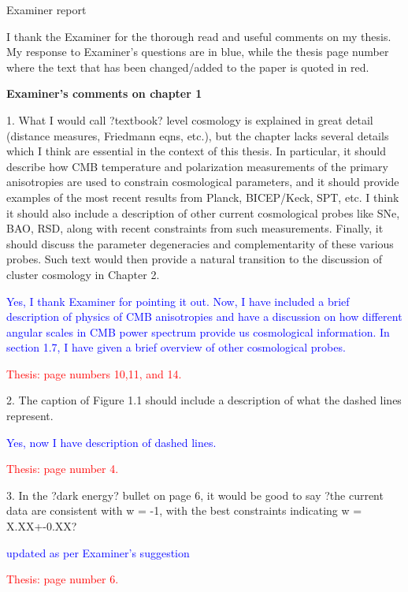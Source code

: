 \documentclass[11pt,a4paper]{article}
\begin{document}
\begin{center}
Examiner report
\end{center}
I thank the Examiner for the thorough read and useful comments on my thesis. My response to Examiner's questions are
in blue, while the thesis page number where the text that has been changed/added to the paper is quoted in red.

\begin{center}
\textbf{Examiner's comments on chapter 1}
\end{center}


1. What I would call ?textbook? level cosmology is explained in great detail (distance
measures, Friedmann eqns, etc.), but the chapter lacks several details which I
think are essential in the context of this thesis. In particular, it should describe
how CMB temperature and polarization measurements of the primary
anisotropies are used to constrain cosmological parameters, and it should
provide examples of the most recent results from Planck, BICEP/Keck, SPT, etc.
I think it should also include a description of other current cosmological probes
like SNe, BAO, RSD, along with recent constraints from such measurements.
Finally, it should discuss the parameter degeneracies and complementarity of
these various probes. Such text would then provide a natural transition to the
discussion of cluster cosmology in Chapter 2.

\textcolor{blue}{Yes, I thank Examiner for pointing it out. Now, I have included a brief description of physics of CMB anisotropies and have a discussion on how different angular scales in CMB power spectrum provide us cosmological information. In section 1.7, I have given a brief overview of other cosmological probes. }

\textcolor{red}{Thesis: page numbers 10,11, and 14.}

2. The caption of Figure 1.1 should include a description of what the dashed lines
represent.

\textcolor{blue}{Yes, now I have description of dashed lines.}

\textcolor{red}{Thesis: page number 4.}

3. In the ?dark energy? bullet on page 6, it would be good to say ?the current data
are consistent with w = -1, with the best constraints indicating w = X.XX+-0.XX?

\textcolor{blue}{updated as per Examiner's suggestion}

\textcolor{red}{Thesis: page number 6.}
\end{document}

